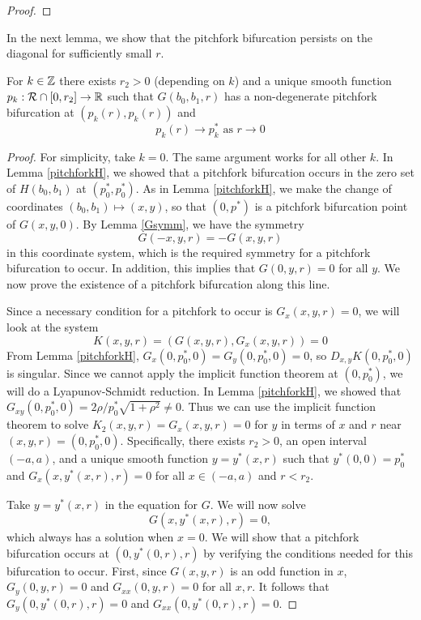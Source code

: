 \documentclass[thesis.tex]{subfiles}
\begin{document}
\begin{lemma}
\begin{proof}
\end{proof}
\end{lemma}

In the next lemma, we show that the pitchfork bifurcation persists on the diagonal for sufficiently small $r$.


\begin{lemma}\label{pitchpersist}
For $k \in \mathbb{Z}$ there exists $r_2 > 0$ (depending on $k$) and a unique smooth function $p_k: \mathcal{R} \cap [0, r_2] \rightarrow \mathbb{R}$ such that $G(b_0, b_1, r)$ has a non-degenerate pitchfork bifurcation at $(p_k(r),p_k(r))$ and 
\begin{equation*}
p_k(r) \rightarrow p_k^* \text{ as } r \rightarrow 0
\end{equation*}
\begin{proof}
For simplicity, take $k = 0$. The same argument works for all other $k$. In Lemma \ref{pitchforkH}, we showed that a pitchfork bifurcation occurs in the zero set of $H(b_0, b_1)$ at $(p_0^*, p_0^*)$. As in Lemma \ref{pitchforkH}, we make the change of coordinates $(b_0, b_1) \mapsto (x, y)$, so that $(0, p^*)$ is a pitchfork bifurcation point of $G(x, y, 0)$. By Lemma \ref{Gsymm}, we have the symmetry 
\[
G(-x, y, r) = -G(x, y, r)
\]
in this coordinate system, which is the required symmetry for a pitchfork bifurcation to occur. In addition, this implies that $G(0, y, r) = 0$ for all $y$. We now prove the existence of a pitchfork bifurcation along this line. 

Since a necessary condition for a pitchfork to occur is $G_x(x, y, r) = 0$, we will look at the system
\begin{equation*}
K(x,y,r) = (G(x,y,r), G_x(x,y,r)) = 0
\end{equation*}
From Lemma \ref{pitchforkH}, $G_x(0,p_0^*,0) = G_y(0, p_0^*, 0) = 0$, so $D_{x,y}K(0,p_0^*,0)$ is singular. Since we cannot apply the implicit function theorem at $(0, p_0^*)$, we will do a Lyapunov-Schmidt reduction. In Lemma \ref{pitchforkH}, we showed that $G_{xy}(0, p_0^*, 0) = 2 \rho/p_0^* \sqrt{1 + \rho^2} \neq 0$. Thus we can use the implicit function theorem to solve $K_2(x,y,r) = G_x(x,y,r) = 0$ for $y$ in terms of $x$ and $r$ near $(x,y,r) = (0, p_0^*, 0)$. Specifically, there exists $r_2 > 0$, an open interval $(-a, a)$, and a unique smooth function $y = y^*(x, r)$ such that $y^*(0, 0) = p_0^*$ and $G_x(x, y^*(x, r), r) = 0$ for all $x \in (-a, a)$ and $r < r_2$.

Take $y = y^*(x, r)$ in the equation for $G$. We will now solve
\begin{equation*}
G(x, y^*(x, r), r) = 0,
\end{equation*}
which always has a solution when $x = 0$. We will show that a pitchfork bifurcation occurs at $(0, y^*(0, r), r)$ by verifying the conditions needed for this bifurcation to occur. First, since $G(x, y, r)$ is an odd function in $x$, $G_y(0, y, r) = 0$ and $G_{xx}(0, y, r) = 0$ for all $x, r$. It follows that $G_y(0, y^*(0, r), r) = 0$ and $G_{xx}(0, y^*(0, r), r) = 0$.


\end{proof}
\end{lemma}
\end{document}
